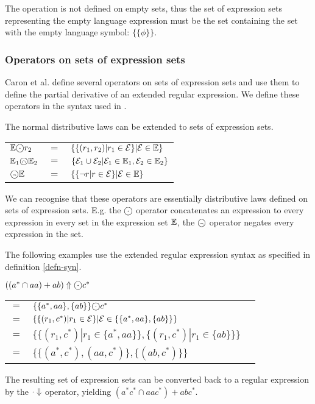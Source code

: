 The operation is not defined on empty sets, thus the set of expression sets
representing the empty language expression must be the set containing the set
with the empty language symbol: $\{\{\phi\}\}$.

\subsubsection{Operators on sets of expression sets}

Caron et al. define several operators on sets of expression sets and use them to
define the partial derivative of an extended regular expression\cite{pdere}. We
define these operators in the syntax used in \cite{pdpat}.

\begin{defn}
   \label{defn-eset-ops}
   The normal distributive laws can be extended to sets of expression sets.

   \begin{tabular}{lll}
      $\esets \circledcdot r_2$
         & $=$
         & $\{ \{ (r_1, r_2) | r_1 \in \mathcal{E} \} | \mathcal{E} \in \mathbb{E} \}$
         \\

      $\mathbb{E}_1 \text{\textcircled{\tiny$\cap$}} \mathbb{E}_2$
         & $=$
         & $\{
              \mathcal{E}_1 \cup \mathcal{E}_2
              | \mathcal{E}_1 \in \mathbb{E}_1, \mathcal{E}_2 \in \mathbb{E}_2
           \}$
         \\

      $\text{\textcircled{\tiny$\neg$}}\mathbb{E}$
         & $=$
         & $\{ \{ \neg r | r \in \mathcal{E} \} | \mathcal{E} \in \mathbb{E} \}$
         \\
   \end{tabular}
\end{defn}

We can recognise that these operators are essentially distributive laws defined
on sets of expression sets. E.g. the $\circledcdot$ operator concatenates an
expression to every expression in every set in the expression set $\mathbb{E}$, the
$\text{\textcircled{\tiny$\neg$}}$ operator negates every expression in the set.

The following examples use the extended regular expression syntax as specified
in definition \ref{defn-syn}.

\needspace{2cm}
\begin{eg}
   $((a^* \cap aa) + ab)\esetsOfRe \circledcdot c^*$

   \begin{tabular}{lll}
      $=$ &
         $\{\{a^*, aa\}, \{ab\}\} \circledcdot c^*$
      \\ $=$ &
         $\{ \{ (r_1, c^*) | r_1 \in \mathcal{E} \} | \mathcal{E} \in \{\{a^*, aa\}, \{ab\}\} \}$
      \\ $=$ &
         $\{ \{ (r_1, c^*) | r_1 \in \{a^*, aa\} \}, \{ (r_1, c^*) | r_1 \in \{ab\} \} \}$
      \\ $=$ &
         $\{ \{ (a^*, c^*), (aa, c^*) \}, \{ (ab, c^*) \} \}$
   \end{tabular}

   The resulting set of expression sets can be converted back to a regular
   expression by the $\cdot\Downarrow$ operator, yielding $(a^*c^* \cap aac^*) +
   abc^*$.
\end{eg}

